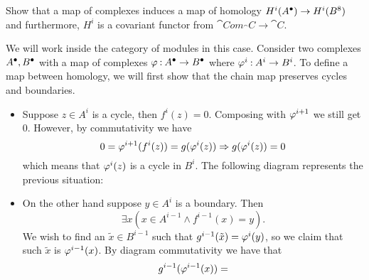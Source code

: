 \documentclass[12pt]{memoir}
\begin{document}
    \begin{Ej}[1.6.D Vakil]
        Show that a map of complexes induces a map of homology $H^{i}(A^\bullet)\to H^i(B^8)$ and furthermore, $H^i$ is a covariant functor from $\cat{Com}_\cat{C}\to\cat{C}$. 
    \end{Ej}
    
    \begin{ptcbr}
    We will work inside the category of modules in this case. Consider two complexes $A^\bullet,B^\bullet$ with a map of complexes $\varphi\mathbin{:}A^\bullet\to B^\bullet$ where $\varphi^i\mathbin{:} A^i\to B^i$. To define a map between homology, we will first show that the chain map preserves cycles and boundaries.
    \begin{itemize}
        \itemsep=-0.4em
        \item Suppose $z\in A^i$ is a cycle, then $f^i(z)=0$. Composing with $\varphi^{i+1}$ we still get $0$. However, by commutativity we have 
        $$0=\varphi^{i+1}(f^i(z))=g(\varphi^i(z))\Rightarrow g(\varphi^i(z))=0$$
        which means that $\varphi^{i}(z)$ is a cycle in $B^{i}$. The following diagram represents the previous situation:
        \begin{center}
        \end{center}
        \item On the other hand suppose $y\in A^{i}$ is a boundary. Then 
        $$\exists x(x\in A^{i-1}\land f^{i-1}(x)=y).$$
        We wish to find an $\widetilde{x}\in B^{i-1}$ such that $g^{i-1}(\tilde{x})=\varphi^i(y)$, so we claim that such $\widetilde{x}$ is $\varphi^{i-1}(x)$. By diagram commutativity we have that 
        $$g^{i-1}(\varphi^{i-1}(x))=$$
    \end{itemize}
    \end{ptcbr}
\end{document}
